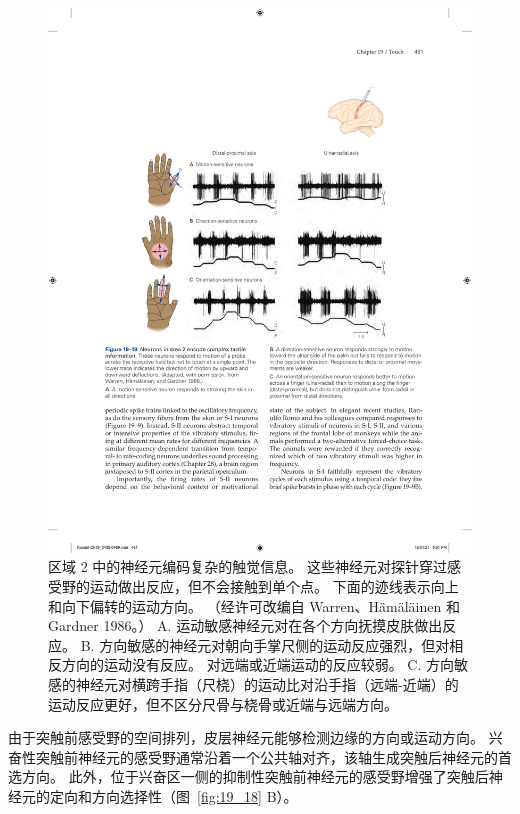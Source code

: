 \begin{figure}[htbp]
	\centering
	\includegraphics[width=1.0\linewidth]{chap19/fig_19_19}
	\caption{区域 2 中的神经元编码复杂的触觉信息。 
		这些神经元对探针穿过感受野的运动做出反应，但不会接触到单个点。
		下面的迹线表示向上和向下偏转的运动方向。 （经许可改编自 Warren、Hämäläinen 和 Gardner 1986。）
		A. 运动敏感神经元对在各个方向抚摸皮肤做出反应。
		B. 方向敏感的神经元对朝向手掌尺侧的运动反应强烈，但对相反方向的运动没有反应。 对远端或近端运动的反应较弱。
		C. 方向敏感的神经元对横跨手指（尺桡）的运动比对沿手指（远端-近端）的运动反应更好，但不区分尺骨与桡骨或近端与远端方向。}
	\label{fig:19_19}
\end{figure}


由于突触前感受野的空间排列，皮层神经元能够检测边缘的方向或运动方向。
兴奋性突触前神经元的感受野通常沿着一个公共轴对齐，该轴生成突触后神经元的首选方向。
此外，位于兴奋区一侧的抑制性突触前神经元的感受野增强了突触后神经元的定向和方向选择性（图~\ref{fig:19_18} B）。



